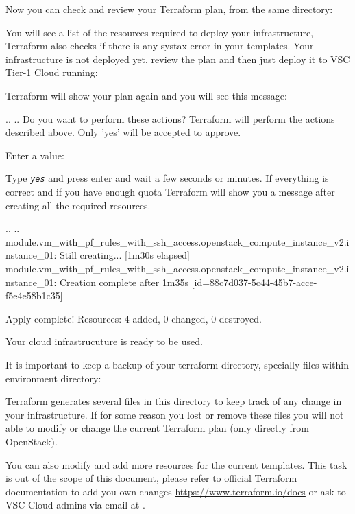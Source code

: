 \begin{prompt}
\end{prompt}

Now you can check and review your Terraform plan, from the same directory:

\begin{prompt}
\end{prompt}

You will see a list of the resources required to deploy your infrastructure, Terraform also checks if there is any systax error in your templates.
Your infrastructure is not deployed yet, review the plan and then just deploy it to VSC Tier-1 Cloud running:

\begin{prompt}
\end{prompt}

Terraform will show your plan again and you will see this message:

\begin{prompt}
..
..
Do you want to perform these actions?
  Terraform will perform the actions described above.
  Only 'yes' will be accepted to approve.

  Enter a value: 
\end{prompt}

Type \texttt{\emph{yes}} and press enter and wait a few seconds or minutes.
If everything is correct and if you have enough quota Terraform will show you a message after creating all the required resources.


\begin{prompt}
..
..
module.vm_with_pf_rules_with_ssh_access.openstack_compute_instance_v2.instance_01: Still creating... [1m30s elapsed]
module.vm_with_pf_rules_with_ssh_access.openstack_compute_instance_v2.instance_01: Creation complete after 1m35s [id=88c7d037-5c44-45b7-acce-f5e4e58b1c35]

Apply complete! Resources: 4 added, 0 changed, 0 destroyed.
\end{prompt}

Your cloud infrastrucuture is ready to be used.

It is important to keep a backup of your terraform directory, specially files within environment directory:
\begin{prompt}
\end{prompt}

Terraform generates several files in this directory to keep track of any change in your infrastructure. If for some reason you lost or remove these files you will not able to modify or change the current Terraform plan (only directly from OpenStack).

You can also modify and add more resources for the current templates. This task is out of the scope of this document, please refer to official Terraform documentation to add you own changes \url{https://www.terraform.io/docs} or ask to VSC Cloud admins via email at \cloudinfo.

